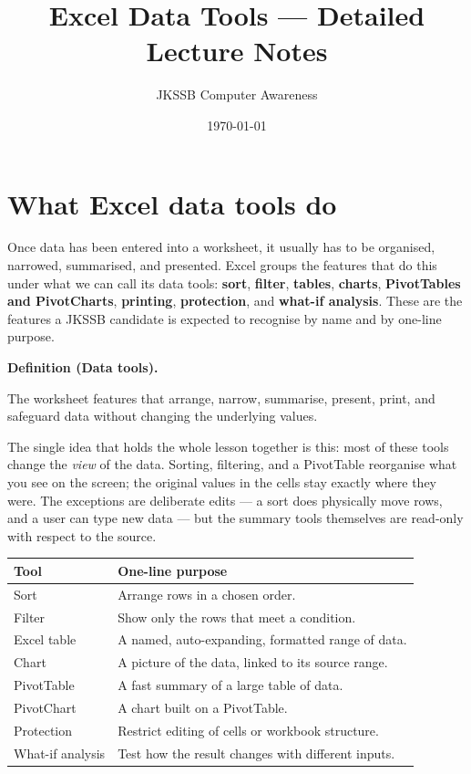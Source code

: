 \documentclass[11pt]{article}
\title{Excel Data Tools --- Detailed Lecture Notes}
\author{JKSSB Computer Awareness}
\date{\today}
\newenvironment{definitionbox}[1]{%
  \par\noindent\textbf{Definition (#1).}\ \itshape
}{\par\vspace{0.3em}}
\begin{document}
\maketitle

\section{What Excel data tools do}
Once data has been entered into a worksheet, it usually has to be organised,
narrowed, summarised, and presented. Excel groups the features that do this
under what we can call its data tools: \textbf{sort}, \textbf{filter},
\textbf{tables}, \textbf{charts}, \textbf{PivotTables and PivotCharts},
\textbf{printing}, \textbf{protection}, and \textbf{what-if analysis}. These are
the features a JKSSB candidate is expected to recognise by name and by
one-line purpose.

\begin{definitionbox}{Data tools}
The worksheet features that arrange, narrow, summarise, present, print, and
safeguard data without changing the underlying values.
\end{definitionbox}

The single idea that holds the whole lesson together is this: most of these
tools change the \emph{view} of the data. Sorting, filtering, and a PivotTable
reorganise what you see on the screen; the original values in the cells stay
exactly where they were. The exceptions are deliberate edits --- a sort does
physically move rows, and a user can type new data --- but the summary tools
themselves are read-only with respect to the source.

\begin{center}
\begin{tabular}{p{}p{}}
\toprule
\textbf{Tool} & \textbf{One-line purpose} \\
\midrule
Sort & Arrange rows in a chosen order. \\
Filter & Show only the rows that meet a condition. \\
Excel table & A named, auto-expanding, formatted range of data. \\
Chart & A picture of the data, linked to its source range. \\
PivotTable & A fast summary of a large table of data. \\
PivotChart & A chart built on a PivotTable. \\
Protection & Restrict editing of cells or workbook structure. \\
What-if analysis & Test how the result changes with different inputs. \\
\bottomrule
\end{tabular}
\end{center}
\end{document}
